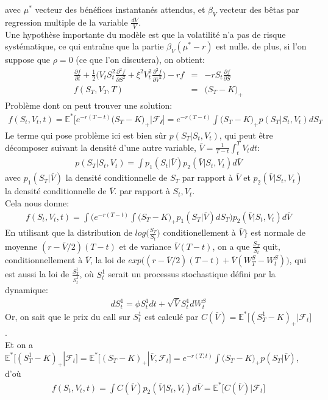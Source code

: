 \documentclass{report}
\begin{document}
avec $\mu^*$ vecteur des bénéfices instantanés attendus, et $\beta_V$ vecteur des bêtas par regression multiple de la variable $\frac{dV}{V}$.\\
Une hypothèse importante  du modèle est que la volatilité n’a pas de risque systématique, ce qui entraîne que la partie $\beta_V(\mu^*- r)$ est nulle. de plus, si l'on suppose que $\rho = 0$ (ce que l'on discutera), on obtient:
\begin{eqnarray*}
\frac{\partial f}{\partial t} + \frac{1}{2}\Big(V_t S_t^2 \frac{\partial^2 f}{\partial S^2} + \xi^2 V_t^2\frac{\partial^2 f}{\partial V^2}\Big) -rf &=& -rS_t\frac{\partial f}{\partial S}\\
f(S_T, V_T, T) &=& \big(S_T - K\big)_+
\end{eqnarray*}
Problème dont on peut trouver une solution:
\begin{eqnarray*}
f(S_t, V_t, t) = \mathbb{E}^*\Big[e^{-r(T-t)}\big(S_T-K\big)_+ \big| \mathcal{F_t}\Big] = e^{-r(T-t)}\int{\big(S_T-K\big)_+ p(S_T | S_t, V_t)dS_T}
\end{eqnarray*}
Le terme qui pose problème ici est bien sûr $p(S_T | S_t, V_t)$, qui peut être décomposer suivant la densité d'une autre variable, $\bar{V} = \frac{1}{T-t}\int_t^T{V_tdt}$:
\begin{eqnarray*}
p(S_T | S_t, V_t) = \int{p_1(S_t | \bar{V})p_2(\bar{V} | S_t, V_t)d\bar{V}}
\end{eqnarray*}
avec $p_1(S_T | \bar{V})$ la densité conditionnelle de $S_T$ par rapport à $\bar{V}$ et $p_2(\bar{V} | S_t, V_t)$ la densité conditionnelle de $\bar{V}$. par rapport à $S_t, V_t$.\\
Cela nous donne:
\begin{eqnarray*}
f(S_t, V_t, t) = \int\Big(	 e^{-r(T-t)}\int{\big(S_T-K\big)_+p_1(S_T | \bar{V})dS_T\Big)p_2(\bar{V} | S_t, V_t)d\bar{V}}
\end{eqnarray*}
En utilisant que la distribution de $log\big(\frac{S_T}{S_t}\big)$ conditionellement à $\bar{V}\}$ est normale de moyenne $(r - \bar{V}/2)(T-t)$ et de variance $\bar{V}(T-t)$, on a que $\frac{S_T}{S_t}$ quit, conditionnellement à $\bar{V}$, la loi de $exp\big((r-\bar{V}/2)(T-t) + \bar{V}(W^S_T - W^S_t)\big)$, qui est aussi la loi de $\frac{S^1_T}{S^1_t}$, où $S^1_t$ serait un processus stochastique défini par la dynamique:
\begin{eqnarray*}
dS^1_t = \phi S^1_t dt + \sqrt{\bar{V}}S^1_t dW^S_t
\end{eqnarray*}
Or, on sait que le prix du call sur $S^1_t$ est calculé par $C(\bar{V}) = \mathbb{E}^*\big[(S^1_T-K)_+ | \mathcal{F}_t\big]$ .\\
Et on a $\mathbb{E}^*\big[(S^1_T-K)_+ | \mathcal{F}_t\big] = \mathbb{E}^*\big[(S_T-K)_+ | \bar{V}, \mathcal{F}_t\big] = e^{-r(T, t)}\int{\big(S_T-K\big)_+p(S_T |\bar{V})}$, d'où 
\begin{eqnarray*}
f(S_t, V_t, t) = \int{C(\bar{V})p_2(\bar{V} | S_t, V_t)d\bar{V}} = \mathbb{E}^*\big[C(\bar{V}) | \mathcal{F}_t\big]
\end{eqnarray*}
\newpage
\end{document}
